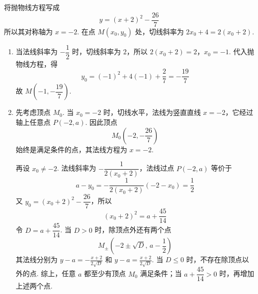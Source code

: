 \begin{solution}
将抛物线方程写成
\[
y=(x+2)^2-\frac{26}{7}
\]
所以其对称轴为 \(x=-2\). 在点 \(M(x_0,y_0)\) 处，切线斜率为 \(2x_0+4=2(x_0+2)\).
\begin{enumerate}
\item 当法线斜率为 \(-\dfrac12\) 时，切线斜率为 \(2\)，所以
\(2(x_0+2)=2\)，\(x_0=-1\).
代入抛物线方程，得
\[
y_0=(-1)^2+4(-1)+\frac27=-\frac{19}{7}
\]
故 \(M\left(-1,-\dfrac{19}{7}\right)\).

\item 先考虑顶点 \(M_0\). 当 \(x_0=-2\) 时，切线水平，法线为竖直直线 \(x=-2\)，它经过轴上任意点 \(P(-2,a)\). 因此顶点
\[
M_0\left(-2,-\frac{26}{7}\right)
\]
始终是满足条件的点，其法线方程为 \(x=-2\).

再设 \(x_0\ne-2\). 法线斜率为 \(-\dfrac1{2(x_0+2)}\)，法线过点 \(P(-2,a)\) 等价于
\[
a-y_0=-\frac1{2(x_0+2)}(-2-x_0)=\frac12
\]
又 \(y_0=(x_0+2)^2-\dfrac{26}{7}\)，所以
\[
(x_0+2)^2=a+\frac{45}{14}
\]
令 \(D=a+\dfrac{45}{14}\). 当 \(D>0\) 时，除顶点外还有两个点
\[
M_{\pm}\left(-2\pm\sqrt D,\,a-\frac12\right)
\]
其法线分别为 \(y-a=-\frac{x+2}{2\sqrt D}\) 和 \(y-a=\frac{x+2}{2\sqrt D}\).
当 \(D\leqslant0\) 时，不存在除顶点以外的点. 综上，任意 \(a\) 都至少有顶点 \(M_0\) 满足条件；当 \(a+\dfrac{45}{14}>0\) 时，再增加上述两个点.
\end{enumerate}
\end{solution}
